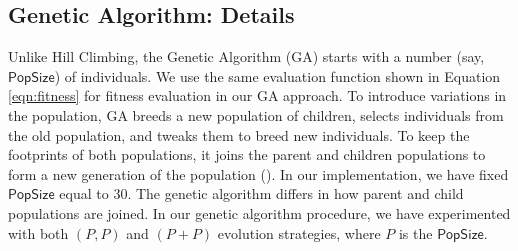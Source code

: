\subsection{Genetic Algorithm: Details}
\label{subsection:method_ga}
Unlike Hill Climbing, the Genetic Algorithm (GA) starts with a number (say, $\mathsf{PopSize}$) of individuals. 
We use the same evaluation function shown in Equation \ref{eqn:fitness} for fitness evaluation in our GA approach. 
To introduce variations in the population, GA breeds a new population of children, selects individuals from the old population, and tweaks them to breed new individuals. 
To keep the footprints of both populations, it joins the parent and children populations to form a new generation of the population (). 
In our implementation, we have fixed $\mathsf{PopSize}$ equal to $30$.
The genetic algorithm differs in how parent and child populations are joined. In our genetic algorithm procedure, we have experimented with both $(P, P)$ and $(P+P)$ evolution strategies, where $P$ is the $\mathsf{PopSize}$.





